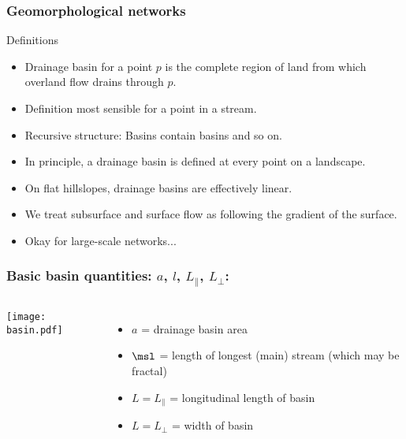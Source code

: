 \begin{frame}[label=]
  \frametitle{Geomorphological networks}

  \begin{block}{Definitions}
    \begin{itemize}
    \item<1-> \alert{Drainage basin} for a point $p$ is the 
      complete region of land from which overland flow drains through $p$.
    \item<2-> Definition most sensible for a point in a stream.
    \item<3-> \alert{Recursive structure:} Basins contain basins and so on.
    \item<4-> In principle, a drainage basin is defined at every point
      on a landscape.
    \item<5-> On flat hillslopes, drainage basins are effectively linear.
    \item<6-> We treat subsurface and surface flow as following
      the gradient of the surface.
    \item<7-> Okay for large-scale networks...
    \end{itemize}
  \end{block}
\end{frame}

\begin{frame}[label=]
  \frametitle{Basic basin quantities: $a$, $l$, $L_\parallel$, $L_\perp$:}

  \begin{columns}
    \texttt{[image: basin.pdf]}
    \begin{itemize}
    \item<2-> 
      \alert{$a$} = drainage basin area
    \item<3-> 
      \alert{$\msl$} = length of longest (main) stream 
      (which may be fractal)
    \item<4-> 
      \alert{$L = L_\parallel$} = longitudinal length of basin
    \item<5-> 
      \alert{$L = L_\perp$} = width of basin
    \end{itemize}

  \end{columns}
\end{frame}


